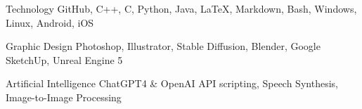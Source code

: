 


\begin{cvskills}


  \cvskill
    {Technology} %
    {GitHub, C++, C, Python, Java, LaTeX, Markdown, Bash, Windows, Linux, Android, iOS} %

  \cvskill
    {Graphic Design} %
    {Photoshop, Illustrator, Stable Diffusion, Blender, Google SketchUp, Unreal Engine 5} %

  \cvskill
    {Artificial Intelligence} %
	{ChatGPT4 \& OpenAI API scripting, Speech Synthesis, Image-to-Image Processing} %


\end{cvskills}

